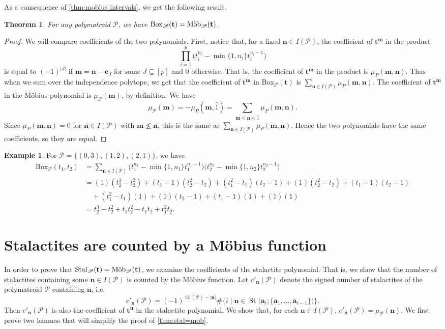 \documentclass[a4paper, 11pt]{amsart}
\newtheorem{theorem}{Theorem}[section]
\theoremstyle{definition}
\newtheorem{example}[example]{Example}
\newcommand{\bfm}{\mathbf{m}}
\newcommand{\bfn}{\mathbf{n}}
\newcommand{\bft}{\mathbf{t}}
\newcommand{\bfa}{\mathbf{a}}
\newcommand{\bfe}{\mathbf{e}}
\newcommand{\sP}{\mathscr{P}}
\DeclareMathOperator{\rk}{rk}
\DeclareMathOperator{\St}{St}
\DeclareMathOperator{\Mob}{\textnormal{M\"ob}}
\begin{document}
As a consequence of \autoref{thm:mobius intervals}, we get the following result. 
\begin{theorem}\label{thm:box=mob}
    For any polymatroid $\sP$, we have $\mathrm{Box}_\sP(\bft) = \Mob_\sP(\bft)$. 
\end{theorem}
\begin{proof}
    We will compare coefficients of the two polynomials. First, notice that, for a fixed $\bfn \in I(\sP)$, the coefficient of $\bft^{\mathbf{m}}$ in the product $$\prod_{i=1}^p \big(t_i^{n_i}-\min\{1, n_i\}t_i^{ n_i-1}\big)$$ is equal to $(-1)^{|J|}$ if $\bfm = \bfn-\bfe_J \text{ for some } J \subseteq [p]$ and $0$ otherwise. That is, the coefficient of $\bft^{\mathbf{m}}$ in the product is $\mu_P(\bfm, \bfn)$. Thus when we sum over the independence polytope, we get that the coefficient of $\bft^\bfm$ in $\mathrm{Box}_\sP(\bft)$ is $\sum_{\bfn \in I(\sP)}\mu_P(\bfm, \bfn)$. The coefficient of $\bft^\bfm$ in the M\"obius polynomial is $\mu_{\sP}(\bfm)$, by definition. We have $$\mu_\sP(\bfm) = -\mu_P(\bfm, \hat{1}) = \sum_{\bfm \le \bfn < \hat{1}} \mu_P(\bfm, \bfn).$$ Since $\mu_P(\bfm, \bfn) = 0$ for $\bfn \in I(\sP)$ with $\bfm \not\le \bfn$, this is the same as $\sum_{\bfn \in I(\sP)}\mu_P(\bfm, \bfn)$. Hence the two polynomials have the same coefficients, so they are equal. 

    
\end{proof}

\begin{example}\label{ex:box}
    For $\sP = \big\{(0,3), (1,2), (2,1)\big\}$, we have 
    \begin{align*}\mathrm{Box}_\sP(t_1,t_2) &= \sum_{\bfn \in I(\sP)}\big(t_1^{n_1}-\min\{1, n_1\}t_1^{n_1-1}\big)\big(t_2^{n_2}-\min\{1, n_2\}t_2^{ n_2-1}\big)\\
    &= (1)(t_2^3-t_2^2)+(t_1-1)(t_2^2-t_2) + (t_1^2-t_1)(t_2-1) + (1)(t_2^2-t_2) + (t_1-1)(t_2-1)\\ & \quad + (t_1^2-t_1)(1) + (1)(t_2-1) + (t_1-1)(1) + (1)(1)\\
    &= t_2^3-t_2^2 + t_1t_2^2-t_1t_2+t_1^2t_2.
    \end{align*}
\end{example}

\section{Stalactites are counted by a M\"obius function}
In order to prove that $\rm{Stal}_{\sP}(\bft) =  \textrm{M\"ob}_{\sP}(\bft)$, we examine the coefficients of the stalactite polynomial. That is, we show that the number of stalactites containing some $\bfn \in I(\sP)$ is counted by the M\"obius function. Let $c'_\bfn(\sP)$ denote the signed number of stalactites of the polymatroid $\sP$ containing $\bfn$, i.e. $$c'_\bfn(\sP) = (-1)^{\rk(\sP)-|\bfn|}\#\Big\{i \mid \bfn \in \St\big(\bfa_i;\{\bfa_1,\ldots,\bfa_{i-1}\}\big)\Big\}.$$ Then $c'_\bfn(\sP)$ is also the coefficient of $\bft^\bfn$ in the stalactite polynomial. We show that, for each $\bfn \in I(\mathscr{P})$, $c'_\bfn(\mathscr{P}) = \mu_{\mathscr{P}}(\bfn)$. We first prove two lemmas that will simplify the proof of \autoref{thm:stal=mob}. 
\end{document}
